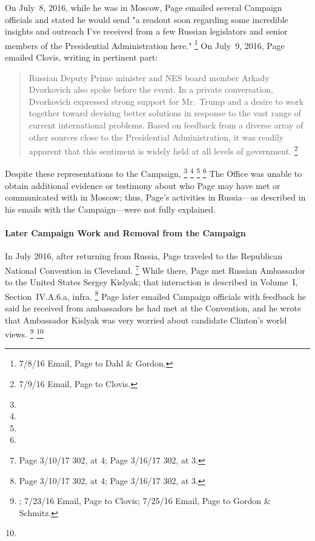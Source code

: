 On July~8, 2016, while he was in Moscow, Page emailed several Campaign officials and stated he would send "a readout soon regarding some incredible insights and outreach I've received from a few Russian legislators and senior members of the Presidential Administration here."%
\footnote{ 7/8/16 Email, Page to Dahl \& Gordon.}
On July~9, 2016, Page emailed Clovis, writing in pertinent part:

\begin{quote}
Russian Deputy Prime minister and NES board member Arkady Dvorkovich also spoke before the event.
In a private conversation, Dvorkovich expressed strong support for Mr.~Trump and a desire to work together toward devising better solutions in response to the vast range of current international problems.
Based on feedback from a diverse array of other sources close to the Presidential Administration, it was readily apparent that this sentiment is widely held at all levels of government.%
\footnote{ 7/9/16 Email, Page to Clovis.}
\end{quote}

Despite these representations to the Campaign,
\footnote{}
\footnote{}
\footnote{}
\footnote{}
The Office was unable to obtain additional evidence or testimony about who Page may have met or communicated with in Moscow; thus, Page's activities in Russia---as described in his emails with the Campaign---were not fully explained.

\paragraph{Later Campaign Work and Removal from the Campaign}

In July 2016, after returning from Russia, Page traveled to the Republican National Convention in Cleveland.%
\footnote{Page 3/10/17 302, at 4;
Page 3/16/17 302, at 3.}
While there, Page met Russian Ambassador to the United States Sergey Kislyak; that interaction is described in Volume~I, Section~IV.A.6.a, infra.%
\footnote{Page 3/10/17 302, at 4;
Page 3/16/17 302, at 3.}
Page later emailed Campaign officials with feedback he said he received from ambassadors he had met at the Convention, and he wrote that Ambassador Kislyak was very worried about candidate Clinton's world views.%
\footnote{; 7/23/16 Email, Page to Clovis;
7/25/16 Email, Page to Gordon \& Schmitz.}
\footnote{}

